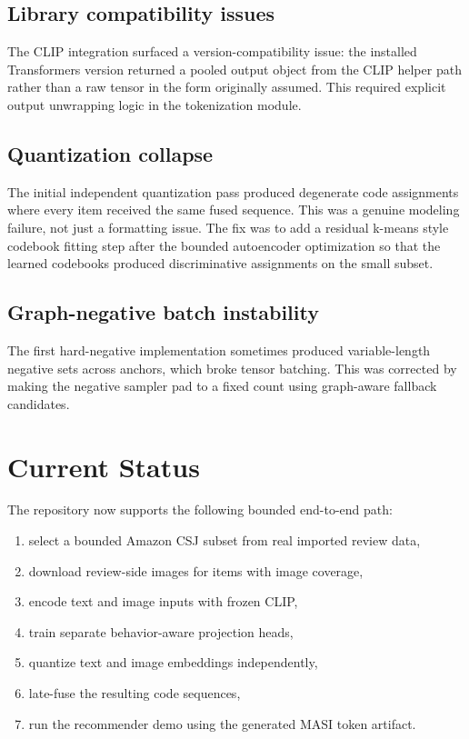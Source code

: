 \documentclass[11pt]{article}
\begin{document}
\subsection{Library compatibility issues}
The CLIP integration surfaced a version-compatibility issue: the installed Transformers version returned a pooled output object from the CLIP helper path rather than a raw tensor in the form originally assumed. This required explicit output unwrapping logic in the tokenization module.

\subsection{Quantization collapse}
The initial independent quantization pass produced degenerate code assignments where every item received the same fused sequence. This was a genuine modeling failure, not just a formatting issue. The fix was to add a residual k-means style codebook fitting step after the bounded autoencoder optimization so that the learned codebooks produced discriminative assignments on the small subset.

\subsection{Graph-negative batch instability}
The first hard-negative implementation sometimes produced variable-length negative sets across anchors, which broke tensor batching. This was corrected by making the negative sampler pad to a fixed count using graph-aware fallback candidates.

\section{Current Status}
The repository now supports the following bounded end-to-end path:
\begin{enumerate}[leftmargin=1.5em]
    \item select a bounded Amazon CSJ subset from real imported review data,
    \item download review-side images for items with image coverage,
    \item encode text and image inputs with frozen CLIP,
    \item train separate behavior-aware projection heads,
    \item quantize text and image embeddings independently,
    \item late-fuse the resulting code sequences,
    \item run the recommender demo using the generated MASI token artifact.
\end{enumerate}
\end{document}
